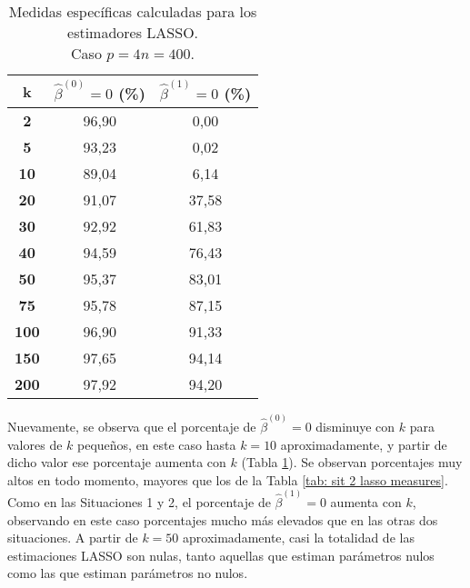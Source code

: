 \documentclass[a4paper,12pt]{report}
\begin{document}
\begin{table}[H]
\centering
\caption{Medidas específicas calculadas para los estimadores LASSO. \\ Caso $p=4n=400$.}
\label{tab: sit 3 lasso measures}
\footnotesize
\begin{tabular}{c|c|c}
\textbf{k} & $\hat{\beta}^{(0)} = 0$ (\%) & $\hat{\beta}^{(1)} = 0$ (\%) \\
\hline
\textbf{2} & 96,90 & \hspace{0.07cm} 0,00 \\
\textbf{5} & 93,23 & \hspace{0.07cm} 0,02 \\
\textbf{10} & 89,04 & \hspace{0.07cm} 6,14 \\
\textbf{20} & 91,07 & 37,58 \\
\textbf{30} & 92,92 & 61,83 \\
\textbf{40} & 94,59 & 76,43 \\
\textbf{50} & 95,37 & 83,01 \\
\textbf{75} & 95,78 & 87,15 \\
\textbf{100} & 96,90 & 91,33 \\
\textbf{150} & 97,65 & 94,14 \\
\textbf{200} & 97,92 & 94,20
\end{tabular}
\end{table}

Nuevamente, se observa que el porcentaje de $\hat{\beta}^{(0)} = 0$ disminuye con $k$ para valores de $k$ pequeños, en este caso hasta $k=10$ aproximadamente, y partir de dicho valor ese porcentaje aumenta con $k$ (Tabla \ref{tab: sit 3 lasso measures}). Se observan porcentajes muy altos en todo momento, mayores que los de la Tabla \ref{tab: sit 2 lasso measures}. Como en las Situaciones 1 y 2, el porcentaje de $\hat{\beta}^{(1)} = 0$ aumenta con $k$, observando en este caso porcentajes mucho más elevados que en las otras dos situaciones. A partir de $k=50$ aproximadamente, casi la totalidad de las estimaciones LASSO son nulas, tanto aquellas que estiman parámetros nulos como las que estiman parámetros no nulos.
\end{document}
